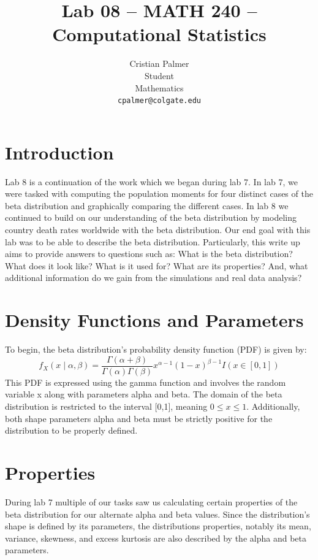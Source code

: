 \documentclass{article}\usepackage[]{graphicx}\usepackage[]{xcolor}
\begin{document}
\vspace{-1in}
\title{Lab 08 -- MATH 240 -- Computational Statistics}

\author{
  Cristian Palmer \\
  Student  \\
  Mathematics  \\
  {\tt cpalmer@colgate.edu}
}

\date{}

\maketitle

\begin{multicols}{2}

\section{Introduction}
Lab 8 is a continuation of the work which we began during lab 7. In lab 7, we were tasked with computing the population moments for four distinct cases of the beta distribution and graphically comparing the different cases. In lab 8 we continued to build on our understanding of the beta distribution by modeling country death rates worldwide with the beta distribution. Our end goal with this lab was to be able to describe the beta distribution. Particularly, this write up aims to provide answers to questions such as: What is the beta distribution? What does it look like? What is it used for? What are its properties? And, what additional information do we gain from the simulations and real data analysis?  


\section{Density Functions and Parameters}
To begin, the beta distribution's probability density function (PDF) is given by: 
\[
f_X(x \mid \alpha, \beta) = \frac{\Gamma(\alpha+\beta)}{\Gamma(\alpha) \Gamma(\beta)} x^{\alpha-1} (1-x)^{\beta-1} I(x \in [0,1])
\]
This PDF is expressed using the gamma function and involves the random variable x along with parameters alpha and beta. The domain of the beta distribution is restricted to the interval [0,1], meaning $0 \leq x \leq 1$. Additionally, both shape parameters alpha and beta must be strictly positive for the distribution to be properly defined. 

\section{Properties}
During lab 7 multiple of our tasks saw us calculating certain properties of the beta distribution for our alternate alpha and beta values. Since the distribution’s shape is defined by its parameters, the distributions properties, notably its mean, variance, skewness, and excess kurtosis are also described by the alpha and beta parameters. 



\end{multicols}
\end{document}
